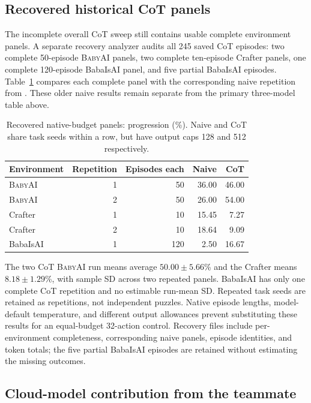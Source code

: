 \documentclass[11pt,a4paper]{article}
\newcommand{\BabyAI}{\textsc{BabyAI}}
\begin{document}
\subsection{Recovered historical CoT panels}

The incomplete overall CoT sweep still contains usable complete environment panels. A separate recovery analyzer audits all 245 saved CoT episodes: two complete 50-episode \BabyAI{} panels, two complete ten-episode Crafter panels, one complete 120-episode BabaIsAI panel, and five partial BabaIsAI episodes. Table~\ref{tab:recoveredcot} compares each complete panel with the corresponding naive repetition from . These older naive results remain separate from the primary three-model table above.

\begin{table}[htbp]
\centering
\caption{Recovered native-budget panels: progression (\%). Naive and CoT share task seeds within a row, but have output caps 128 and 512 respectively.}
\label{tab:recoveredcot}
\small
\begin{tabular}{@{}lrrrr@{}}
\toprule
Environment & Repetition & Episodes each & Naive & CoT \\
\midrule
\BabyAI{} & 1 & 50 & 36.00 & 46.00 \\
\BabyAI{} & 2 & 50 & 26.00 & 54.00 \\
Crafter & 1 & 10 & 15.45 & 7.27 \\
Crafter & 2 & 10 & 18.64 & 9.09 \\
BabaIsAI & 1 & 120 & 2.50 & 16.67 \\
\bottomrule
\end{tabular}
\end{table}

The two CoT \BabyAI{} run means average $50.00\pm5.66$\% and the Crafter means $8.18\pm1.29$\%, with sample SD across two repeated panels. BabaIsAI has only one complete CoT repetition and no estimable run-mean SD. Repeated task seeds are retained as repetitions, not independent puzzles. Native episode lengths, model-default temperature, and different output allowances prevent substituting these results for an equal-budget 32-action control. Recovery files include per-environment completeness, corresponding naive panels, episode identities, and token totals; the five partial BabaIsAI episodes are retained without estimating the missing outcomes.

\subsection{Cloud-model contribution from the teammate}
\end{document}

